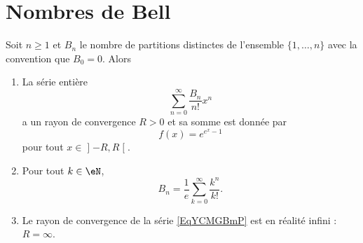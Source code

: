 \section{Nombres de Bell}

\begin{theorem}  \label{ThoYFAzwSg}
    Soit \( n\geq 1\) et \( B_n\) le nombre de partitions distinctes de l'ensemble \( \{ 1,\ldots, n \}\) avec la convention que \( B_0=0\). Alors
    \begin{enumerate}
        \item
            La série entière
            \begin{equation}    \label{EqYCMGBmP}
                \sum_{n=0}^{\infty}\frac{ B_n }{ n! }x^n
            \end{equation}
            a un rayon de convergence \( R>0\) et sa somme est donnée par
            \begin{equation}
                f(x)= e^{ e^{x}-1}
            \end{equation}
            pour tout \( x\in\mathopen] -R , R \mathclose[\).
        \item
            Pour tout \( k\in \eN\),
            \begin{equation}
                B_n=\frac{1}{ e }\sum_{k=0}^{\infty}\frac{ k^n }{ k! }.
            \end{equation}
            \item
                Le rayon de convergence de la série \eqref{EqYCMGBmP} est en réalité infini : \( R=\infty\).
    \end{enumerate}
\end{theorem}

